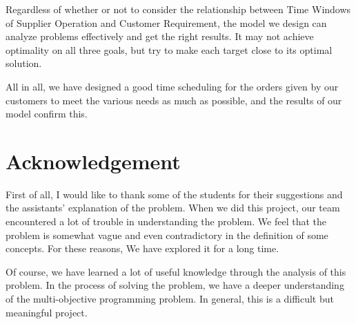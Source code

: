 \documentclass{llncs}
\begin{document}
Regardless of whether or not to consider the relationship between Time Windows of Supplier Operation and Customer Requirement, the model we design can analyze problems effectively and get the right results. It may not achieve optimality on all three goals, but try to make each target close to its optimal solution.

All in all, we have designed a good time scheduling for the orders given by our customers to meet the various needs as much as possible, and the results of our model confirm this.

\section*{Acknowledgement}

First of all, I would like to thank some of the students for their suggestions and the assistants' explanation of the problem. When we did this project, our team encountered a lot of trouble in understanding the problem. We feel that the problem is somewhat vague and even contradictory in the definition of some concepts. For these reasons, We have explored it for a long time.

Of course, we have learned a lot of useful knowledge through the analysis of this problem. In the process of solving the problem, we have a deeper understanding of the multi-objective programming problem. In general, this is a difficult but meaningful project.
\end{document}
